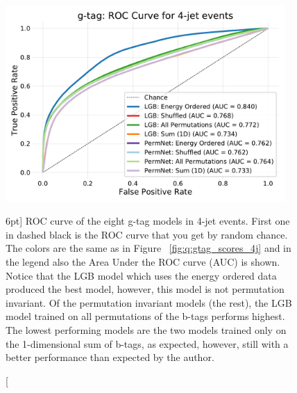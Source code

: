 \documentclass[a4paper, twoside]{tufte-book}
\newcommand{\figref}[1]{Figure ~\ref{#1}}
\begin{document}
\begin{figure}
  \includegraphics[width=0.95\textwidth, trim=10 10 10 40, clip]{figures/quarks/gtag_ROC_4_jet-down_sample=1.00-ML_vars=vertex-selection=b-ejet_min=4-n_iter_RS_lgb=99-n_iter_RS_xgb=9-cdot_cut=0.90-version=19.pdf}
  \caption[ROC curve for g-tag in 4-jet events][6pt]
          {ROC curve of the eight g-tag models in 4-jet events. First one in dashed black is the ROC curve that you get by random chance. The colors are the same as in \figref{fig:q:gtag_scores_4j} and in the legend also the Area Under the ROC curve (AUC) is shown. 
          Notice that the LGB model which uses the energy ordered data produced the best model, however, this model is not permutation invariant. Of the permutation invariant models (the rest), the LGB model trained on all permutations of the b-tags performs highest. The lowest performing models are the two models trained only on the 1-dimensional sum of b-tags, as expected, however, still with a better performance than expected by the author.  
          } 
  \label{fig:q:roc_gtag_4j}
\end{figure}
\end{document}
